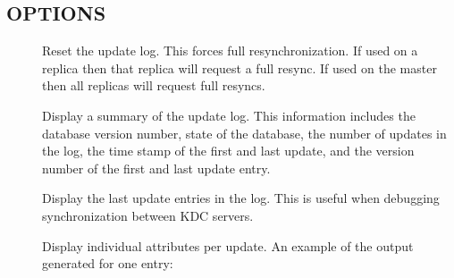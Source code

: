 \documentclass[letterpaper,10pt,english]{sphinxmanual}
\begin{document}
\subsection{OPTIONS}
\label{\detokenize{admin/admin_commands/kproplog:options}}\begin{description}
\item[{}] \leavevmode
Reset the update log.  This forces full resynchronization.  If
used on a replica then that replica will request a full resync.
If used on the master then all replicas will request full resyncs.

\item[{}] \leavevmode
Display a summary of the update log.  This information includes
the database version number, state of the database, the number of
updates in the log, the time stamp of the first and last update,
and the version number of the first and last update entry.

\item[{ }] \leavevmode
Display the last  update entries in the log.  This is useful
when debugging synchronization between KDC servers.

\item[{}] \leavevmode
Display individual attributes per update.  An example of the
output generated for one entry:

%
\begin{sphinxVerbatim}[commandchars=\\\{\}]
 
     
      
      
      
      
           
      
          
           
          
          
          
\end{sphinxVerbatim}

\end{description}
\end{document}
